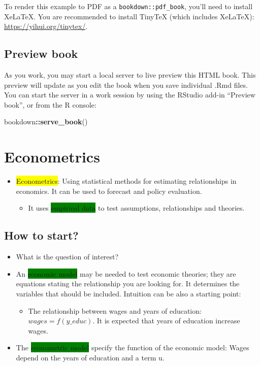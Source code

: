 \documentclass[
]{book}
\newenvironment{Shaded}{\begin{snugshade}}{\end{snugshade}}
\newcommand{\FunctionTok}[1]{\textcolor[rgb]{0.13,0.29,0.53}{\textbf{#1}}}
\newcommand{\NormalTok}[1]{#1}
\newcommand{\SpecialCharTok}[1]{\textcolor[rgb]{0.81,0.36,0.00}{\textbf{#1}}}
\providecommand{\tightlist}{%
  \setlength{\itemsep}{0pt}\setlength{\parskip}{0pt}}
\newcommand{\defi}[1]{\colorbox{yellow}{#1}}
\newcommand{\key}[1]{\colorbox{green}{#1}}
\theoremstyle{definition}
\theoremstyle{definition}
\theoremstyle{definition}
\theoremstyle{definition}
\theoremstyle{remark}
\begin{document}
To render this example to PDF as a \texttt{bookdown::pdf\_book}, you'll need to install XeLaTeX. You are recommended to install TinyTeX (which includes XeLaTeX): \url{https://yihui.org/tinytex/}.

\section{Preview book}\label{preview-book}

As you work, you may start a local server to live preview this HTML book. This preview will update as you edit the book when you save individual .Rmd files. You can start the server in a work session by using the RStudio add-in ``Preview book'', or from the R console:

\begin{Shaded}
\begin{Highlighting}[]
\NormalTok{bookdown}\SpecialCharTok{::}\FunctionTok{serve\_book}\NormalTok{()}
\end{Highlighting}
\end{Shaded}

\chapter{Econometrics}\label{intro}

\begin{itemize}
\item
  \defi{Econometrics}: Using statistical methods for estimating relationships in economics. It can be used to forecast and policy evaluation.

  \begin{itemize}
  \tightlist
  \item
    It uses \key{empirical data} to test assumptions, relationships and theories.
  \end{itemize}
\end{itemize}

\section*{How to start?}\label{how-to-start}

\begin{itemize}
\item
  What is the question of interest?
\item
  An \key{economic model} may be needed to test economic theories; they are equations stating the relationship you are looking for. It determines the variables that should be included. Intuition can be also a starting point:

  \begin{itemize}
  \tightlist
  \item
    The relationship between wages and years of education: \(wages=f(y\_educ)\). It is expected that years of education increase wages.
  \end{itemize}
\item
  The \key{econometric model} specify the function of the economic model: Wages depend on the years of education and a term u.
\end{itemize}
\end{document}

